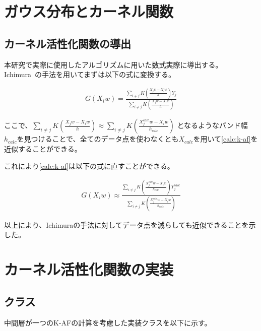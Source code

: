 \appendix
\chapter{ガウス分布とカーネル関数}


\section{カーネル活性化関数の導出}
\label{appendix:calc}

本研究で実際に使用したアルゴリズムに用いた数式実際に導出する。
Ichimura~\cite{ichimura}の手法を用いてまずは以下の式に変換する。


\begin{eqnarray}
G(X_iw)=\frac{\sum_{i\neq j} K\left(\frac{X_j w - X_i w}{h}\right)Y_j}{\sum_{i\neq j} K\left(\frac{X_j w - X_i w}{h}\right)}
\label{calc:k-af}
\end{eqnarray}

ここで、$ \sum_{i\neq j} K\left(\frac{X_j w - X_i w}{h}\right) \approx	\sum_{i\neq j} K\left(\frac{X^{calc}_j w - X_i w}{h_{calc}}\right)$
となるようなバンド幅$ h_{calc} $を見つけることで、全てのデータ点を使わなくとも$ X_{calc} $を用いて\ref{calc:k-af}を近似することができる。

これにより\ref{calc:k-af}は以下の式に直すことができる。

\begin{eqnarray}
G(X_iw) \approx \frac{\sum_{i\neq j} K\left(\frac{X^{calc}_j w - X_i w}{h_{calc}}\right)Y^{calc}_j}{\sum_{i\neq j} K\left(\frac{X^{calc}_j w - X_i w}{h_{calc}}\right)}
\label{calc:k-af-2}
\end{eqnarray}

以上により、Ichimuraの手法に対してデータ点を減らしても近似できることを示した。


\chapter{カーネル活性化関数の実装}
\label{appendix:algorithm}


\section{クラス}


中間層が一つのK-AFの計算を考慮した実装クラスを以下に示す。


